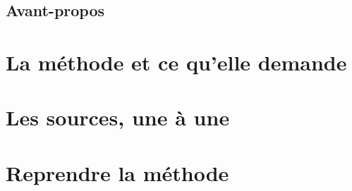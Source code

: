 



\couverture
\maketitle
\sloppy

\chapter*{Avant-propos}


\tableofcontents
\cleardoublepage

\part{La méthode et ce qu'elle demande}




\part{Les sources, une à une}







\part{Reprendre la méthode}



\appendix


\quatrieme


